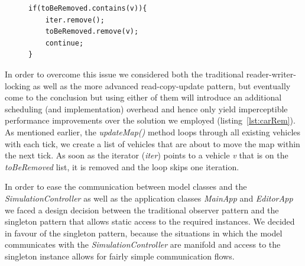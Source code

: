 \begin{figure}
	\begin{minipage}{0.45\textwidth}
		\begin{lstlisting}[caption={Car Removal}, label={lst:carRem}]
if(toBeRemoved.contains(v)){
	iter.remove();
	toBeRemoved.remove(v);
	continue;
}	
		\end{lstlisting}
	\end{minipage}
\end{figure}

In order to overcome this issue we considered both the traditional reader-writer-locking as well as the more advanced read-copy-update pattern, but eventually come to the conclusion but using either of them will introduce an additional scheduling (and implementation) overhead and hence only yield imperceptible performance improvements over the solution we employed (listing~\ref{lst:carRem}). As mentioned earlier, the \textit{updateMap()} method loops through all existing vehicles with each tick, we create a list of vehicles that are about to move the map within the next tick. As soon as the iterator (\textit{iter}) points to a vehicle \textit{v} that is on the \textit{toBeRemoved} list, it is removed and the loop skips one iteration.  

In order to ease the communication between model classes and the \textit{SimulationController} as well as the application classes \textit{MainApp} and \textit{EditorApp} we faced a design decision between the traditional observer pattern and the singleton pattern that allows static access to the required instances. We decided in favour of the singleton pattern, because the situations in which the model communicates with the \textit{SimulationController} are manifold and access to the singleton instance allows for fairly simple communication flows.


